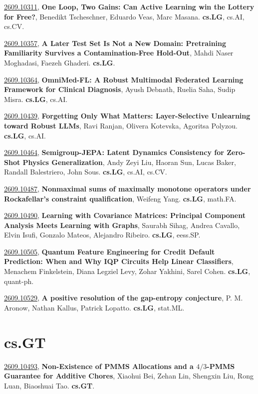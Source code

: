 \documentclass[9pt, a4paper]{article}
\theoremstyle{plain}
\theoremstyle{definition}
\theoremstyle{remark}
\newcommand{\arxivwithtarget}[3]{\hypertarget{#1}{}\href{https://arxiv.org/abs/#1}{#1}, \textbf{\textcolor{arxivblue}{#2}}, #3. }
\begin{document}
\arxivwithtarget{2609.10311}{One Loop, Two Gains: Can Active Learning win the Lottery for Free?}{Benedikt Tscheschner, Eduardo Veas, Marc Masana}\textbf{cs.LG}, cs.AI, cs.CV.



\arxivwithtarget{2609.10357}{A Later Test Set Is Not a New Domain: Pretraining Familiarity Survives a Contamination-Free Hold-Out}{Mahdi Naser Moghadasi, Faezeh Ghaderi}\textbf{cs.LG}.



\arxivwithtarget{2609.10364}{OmniMed-FL: A Robust Multimodal Federated Learning Framework for Clinical Diagnosis}{Ayush Debnath, Ruelia Saha, Sudip Misra}\textbf{cs.LG}, cs.AI.



\arxivwithtarget{2609.10439}{Forgetting Only What Matters: Layer-Selective Unlearning toward Robust LLMs}{Ravi Ranjan, Olivera Kotevska, Agoritsa Polyzou}\textbf{cs.LG}, cs.AI.



\arxivwithtarget{2609.10464}{Semigroup-JEPA: Latent Dynamics Consistency for Zero-Shot Physics Generalization}{Andy Zeyi Liu, Haoran Sun, Lucas Baker, Randall Balestriero, John Sous}\textbf{cs.LG}, cs.AI, cs.CV.



\arxivwithtarget{2609.10487}{Nonmaximal sums of maximally monotone operators under Rockafellar's constraint qualification}{Weifeng Yang}\textbf{cs.LG}, math.FA.



\arxivwithtarget{2609.10490}{Learning with Covariance Matrices: Principal Component Analysis Meets Learning with Graphs}{Saurabh Sihag, Andrea Cavallo, Elvin Isufi, Gonzalo Mateos, Alejandro Ribeiro}\textbf{cs.LG}, eess.SP.



\arxivwithtarget{2609.10505}{Quantum Feature Engineering for Credit Default Prediction: When and Why IQP Circuits Help Linear Classifiers}{Menachem Finkelstein, Diana Legziel Levy, Zohar Yakhini, Sarel Cohen}\textbf{cs.LG}, quant-ph.



\arxivwithtarget{2609.10529}{A positive resolution of the gap-entropy conjecture}{P. M. Aronow, Nathan Kallus, Patrick Lopatto}\textbf{cs.LG}, stat.ML.



\section{cs.GT}
\arxivwithtarget{2609.10493}{Non-Existence of PMMS Allocations and a $4/3$-PMMS Guarantee for Additive Chores}{Xiaohui Bei, Zehan Lin, Shengxin Liu, Rong Luan, Biaoshuai Tao}\textbf{cs.GT}.
\end{document}
